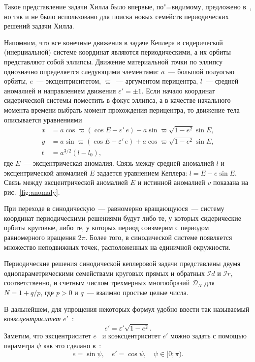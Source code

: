 \documentclass[14pt,a4paper%
]{extarticle}
\begin{document}
Такое представление задачи Хилла было впервые, по"=видимому, предложено в~\cite{Bruno96}, но так и не было использовано для поиска новых семейств периодических решений задачи Хилла.

Напомним, что все конечные движения в задаче Кеплера в сидерической (инерциальной) системе координат являются периодическими, а их орбиты представляют собой эллипсы. Движение материальной точки по эллипсу однозначно определяется следующими элементами: $a$~--- большой полуосью орбиты, $e$~--- эксцентриситетом,  $\varpi$~--- аргументом перицентра, $l$~--- средней аномалией и направлением движения $\varepsilon'=\pm1$. Если начало координат сидерической системы поместить в фокус эллипса, а в качестве начального момента времени выбрать момент прохождения перицентра, то движение тела описывается уравнениями
\begin{equation}\label{eq:sideric}
\begin{aligned}
x&=a\cos \varpi  \left( \cos  E  -\varepsilon'\,e \right) -a\sin  \varpi  \sqrt {1-{e}^{2}}\sin E,\\
y&=a\sin  \varpi  \left( \cos E  -\varepsilon'\,e \right) +a\cos \varpi  \sqrt {1-{e}^{2}}\sin E,\\
t&={a}^{3/2}(l-l_0),%
\end{aligned}
\end{equation}
где $E$~--- эксцентрическая аномалия. Связь между средней аномалией $l$ и эксцентрической аномалией $E$ задается уравнением Кеплера: $l=E-e\sin E$. Связь между %
эксцентрической аномалией $E$ и истинной аномалией $v$ показана на рис.~\ref{fig:anomaly}.

При переходе в синодическую~--- равномерно вращающуюся~--- систему координат периодическими решениями будут либо те, у которых сидерические орбиты круговые, либо те, у которых период соизмерим с периодом равномерного вращения $2\pi$. Более того, в синодической системе появляется множество неподвижных точек, расположенных на единичной окружности.

Периодические решения синодической кеплеровой задачи представлены двумя однопараметрическими семействами круговых прямых и обратных $\mathcal Id$ и $\mathcal Ir$, соответственно, и счетным числом трехмерных многообразий $\mathcal D_N$ для $N=1+q/p$, где $p>0$ и $q$~--- взаимно простые целые числа.

В дальнейшем, для упрощения некоторых формул удобно ввести так называемый \textit{коэксцентриситет} $e'$~\cite[\S~3.3]{Henon97}:
\begin{equation}
  e'=\varepsilon'\sqrt{1-e^2}.
\end{equation}
Заметим, что эксцентриситет $e$  и коэксцентриситет $e'$ можно задать с помощью параметра $\psi$ как это сделано в~\cite[\S~3.3.1]{Henon97}:
\begin{equation}
  e=\sin\psi,\quad e'=\cos\psi,\quad \psi\in[0;\pi).
\end{equation}
\end{document}
